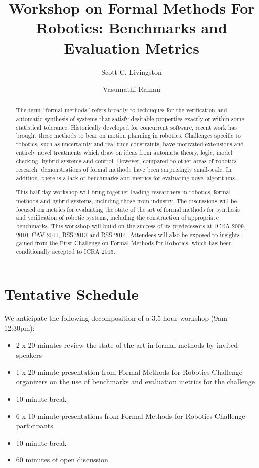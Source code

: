 \documentclass{amsart}
\theoremstyle{definition}
\begin{document}
\title{Workshop on Formal Methods For Robotics: Benchmarks and Evaluation Metrics}
\author{Scott C. Livingston}
\author{Vasumathi Raman}

\begin{abstract} %
The term ``formal methods'' refers broadly to techniques for the verification and automatic synthesis of systems that satisfy desirable properties exactly or within some statistical tolerance.  Historically developed for concurrent software, recent work has brought these methods to bear on motion planning in robotics. Challenges specific to robotics, such as uncertainty and
real-time constraints, have motivated extensions and entirely novel treatments which draw on ideas from automata theory, logic, model checking, hybrid systems and control.  However, compared to other areas of robotics research, demonstrations of formal methods have been surprisingly small-scale. In addition, there is a lack of benchmarks and metrics for evaluating novel algorithms.

This half-day workshop will bring together leading researchers in robotics, formal methods and hybrid systems, including those from industry. The discussions will be focused on metrics for evaluating the state of the art of formal methods for synthesis and verification of robotic systems, including the construction of appropriate benchmarks. This workshop will build on the success of its predecessors at ICRA 2009, 2010, CAV 2011, RSS 2013 and RSS 2014. Attendees will also be exposed to insights gained from the First Challenge on Formal Methods for Robotics, which has been conditionally accepted to ICRA 2015.

\end{abstract}
\maketitle


\section{Tentative Schedule}
We anticipate the following decomposition of a 3.5-hour workshop (9am-12:30pm):
\begin{itemize}
\item 2 x 20 minutes review the state of the art in formal methods by invited speakers 
\item 1 x 20 minute presentation from Formal Methods for Robotics Challenge organizers on the use of benchmarks and evaluation metrics for the challenge 
\item 10 minute break
\item 6 x 10 minute presentations from Formal Methods for Robotics Challenge participants
\item 10 minute break
\item 60 minutes of open discussion
\end{itemize}
\end{document}

